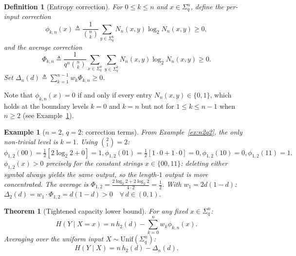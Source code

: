 \documentclass[conference]{IEEEtran}
\newtheorem{theorem}{Theorem}
\newtheorem{definition}{Definition}
\newtheorem{example}{Example}
\begin{document}
\begin{definition}[Entropy correction]
\label{def:Phi}
For $0\le k\le n$ and $x\in\Sigma_q^n$, define the
\emph{per-input correction}
\begin{equation}
  \phi_{k,n}(x)\triangleq \frac{1}{\binom{n}{k}}
  \sum_{y\in\Sigma_q^k}N_n(x,y)\log_2 N_n(x,y)\ge 0,
  \label{eq:phi}
\end{equation}
and the \emph{average correction}
\begin{equation}
  \Phi_{k,n}\triangleq \frac{1}{q^n\binom{n}{k}}
  \sum_{x\in\Sigma_q^n}\sum_{y\in\Sigma_q^k}
  N_n(x,y)\log_2 N_n(x,y)\ge 0.
  \label{eq:Phi}
\end{equation}
Set $\Delta_n(d)\triangleq \sum_{k=1}^{n-1}w_k\Phi_{k,n}\ge 0$.
\end{definition}

Note that $\phi_{k,n}(x)=0$ if and only if every entry $N_n(x,y)
\in\{0,1\}$, which holds at the boundary levels $k=0$ and $k=n$
but not for $1\le k\le n-1$ when $n\ge 2$ (see Example~\ref{ex:phi}).

\begin{example}[$n=2$, $q=2$: correction terms]
\label{ex:phi}
From Example~\ref{ex:n2q2}, the only non-trivial level is $k=1$.
Using $\binom{2}{1}=2$:
\(
\phi_{1,2}(00)=\tfrac{1}{2}[2\log_2 2+0]=1,
\phi_{1,2}(01)=\tfrac{1}{2}[1\cdot 0+1\cdot 0]=0,
\phi_{1,2}(10)=0,
\phi_{1,2}(11)=1.
\)
$\phi_{1,2}(x)>0$ precisely for the constant strings $x\in\{00,11\}$:
deleting either symbol always yields the same output, so the length-$1$
output is more concentrated.  The average is
$\Phi_{1,2}=\frac{2\log_2 2+2\log_2 2}{4\cdot 2}=\frac{1}{2}$.
With $w_1=2d(1-d)$:
\(
\Delta_2(d)=w_1\cdot\Phi_{1,2}=d(1-d)>0\quad\forall\,d\in(0,1).
\)
\end{example}

\begin{theorem}[Tightened capacity lower bound]
\label{thm:tighter_HYX}
For any fixed $x\in\Sigma_q^n$:
\begin{equation}
  H(Y\mid X=x)= n\,h_2(d)-\sum_{k=0}^n w_k\phi_{k,n}(x).
\end{equation}
Averaging over the uniform input $X\sim\mathrm{Unif}(\Sigma_q^n)$:
\begin{equation}
  H(Y\mid X)= n\,h_2(d)-\Delta_n(d).
  \label{eq:tighter_HYX}
\end{equation}
\end{theorem}
\end{document}
